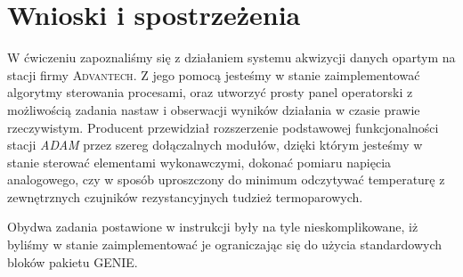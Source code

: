 \documentclass[12pt]{article}
\begin{document}
\newpage

\section{Wnioski i spostrzeżenia}

W ćwiczeniu zapoznaliśmy się z działaniem systemu akwizycji danych opartym na
stacji firmy \textsc{Advantech}. Z jego pomocą jesteśmy w stanie zaimplementować
algorytmy sterowania procesami, oraz utworzyć prosty panel operatorski z
możliwością zadania nastaw i obserwacji wyników działania w czasie prawie
rzeczywistym.
Producent przewidział rozszerzenie podstawowej funkcjonalności stacji
\textit{ADAM} przez szereg dołączalnych modułów, dzięki którym jesteśmy w stanie
sterować elementami wykonawczymi, dokonać pomiaru napięcia analogowego, czy w
sposób uproszczony do minimum odczytywać temperaturę z zewnętrznych czujników
rezystancyjnych tudzież termoparowych.

Obydwa zadania postawione w instrukcji były na tyle nieskomplikowane, iż byliśmy
w stanie zaimplementować je ograniczając się do użycia standardowych bloków
pakietu \textsc{GENIE}.
\end{document}

